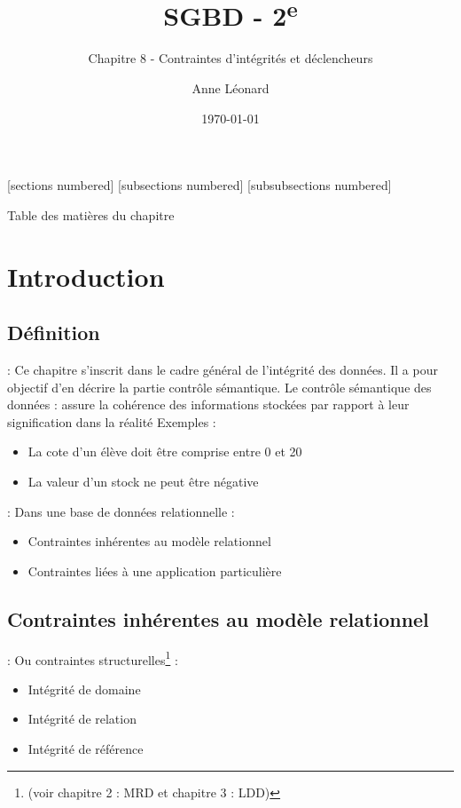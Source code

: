 \documentclass[10pt]{beamer}
\title{SGBD - 2\textsuperscript{e}}
\subtitle{Chapitre 8 - Contraintes d'intégrités et déclencheurs}
\date{\today}
\author{Anne Léonard}
\institute{Haute École de la Province de Liège}
\begin{document}
\maketitle

[sections numbered]
[subsections numbered]
[subsubsections numbered]
\begin{frame}[allowframebreaks]{Table des matières du chapitre}
    \tableofcontents[subsectionstyle=show/show/hide,subsubsectionstyle=show/show/hide,]
\end{frame}

\section{Introduction}
\tocss
\subsection{Définition}
\begin{frame}{\secname : \subsecname}
    Ce chapitre s'inscrit dans le cadre général de l'intégrité des données.  Il a pour objectif d'en décrire la partie contrôle sémantique.
    Le contrôle sémantique des données : assure la cohérence des informations stockées par rapport à leur signification dans la réalité
    Exemples :
    \begin{itemize}
        \item La cote d'un élève doit être comprise entre 0 et 20
        \item La valeur d'un stock ne peut être négative
    \end{itemize}
\end{frame}

\begin{frame}{\secname : \subsecname}
    Dans une base de données relationnelle :
    \begin{itemize}
        \item Contraintes inhérentes au modèle relationnel
        \item Contraintes liées à une application particulière
    \end{itemize}
\end{frame}

\subsection{Contraintes inhérentes au modèle relationnel}
\begin{frame}{\secname : \subsecname}
    Ou contraintes structurelles\footnote{(voir chapitre 2  : MRD et chapitre 3 : LDD)
    } :
    \begin{itemize}
        \item Intégrité de domaine
        \item Intégrité de relation
        \item Intégrité de référence
    \end{itemize}
\end{frame}
\end{document}

